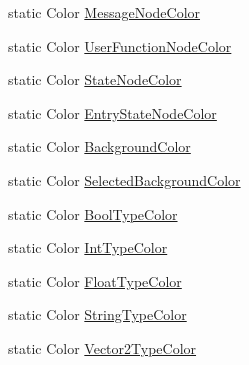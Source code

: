\begin{DoxyCompactItemize}
static Color \hyperlink{classi_c_s___preferences_controller_ae6377fce03536d45f62667ae262b1ef4}{Message\+Node\+Color}
\item 
static Color \hyperlink{classi_c_s___preferences_controller_ae939aa09249b451b7ddb92c272c89aea}{User\+Function\+Node\+Color}
\item 
static Color \hyperlink{classi_c_s___preferences_controller_af77b836c70d882c369cf45b15f7ee2a1}{State\+Node\+Color}
\item 
static Color \hyperlink{classi_c_s___preferences_controller_a853ce5e52bae92b1b01cba8f373fbe35}{Entry\+State\+Node\+Color}
\item 
static Color \hyperlink{classi_c_s___preferences_controller_a0e0ed389fc2bbacb47fb46299771a4c6}{Background\+Color}
\item 
static Color \hyperlink{classi_c_s___preferences_controller_ab5a21b42ff7ac5d0772f0ac012547d7e}{Selected\+Background\+Color}
\item 
static Color \hyperlink{classi_c_s___preferences_controller_afccf5e467a9ec671eafa82ce33a7db6e}{Bool\+Type\+Color}
\item 
static Color \hyperlink{classi_c_s___preferences_controller_a5e056119409ce6e8877cf05cf6d0d0de}{Int\+Type\+Color}
\item 
static Color \hyperlink{classi_c_s___preferences_controller_aa58f6d445108cb3541ca604219f624ee}{Float\+Type\+Color}
\item 
static Color \hyperlink{classi_c_s___preferences_controller_ac9f21da90460198399fa072fef55eaff}{String\+Type\+Color}
\item 
static Color \hyperlink{classi_c_s___preferences_controller_a9d989303122a70395fe1c2443ee2e9ad}{Vector2\+Type\+Color}

\end{DoxyCompactItemize}
